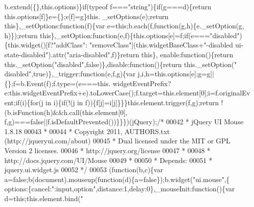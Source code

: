 \begin{DoxyCode}
      b.extend(\{\},this.options)\}\textcolor{keywordflow}{if}(typeof f===\textcolor{stringliteral}{"string"})\{\textcolor{keywordflow}{if}(g===d)\{\textcolor{keywordflow}{return} this.options[f]\}e=\{\};e[f]=g\}this.
      \_setOptions(e);\textcolor{keywordflow}{return} \textcolor{keyword}{this}\},\_setOptions:\textcolor{keyword}{function}(f)\{var e=\textcolor{keyword}{this};b.each(f,\textcolor{keyword}{function}(g,h)\{e.\_setOption(g,
      h)\});\textcolor{keywordflow}{return} \textcolor{keyword}{this}\},\_setOption:\textcolor{keyword}{function}(e,f)\{this.options[e]=f;\textcolor{keywordflow}{if}(e===\textcolor{stringliteral}{"disabled"})\{this.widget()[f?\textcolor{stringliteral}{"addClass"}:\textcolor{stringliteral}{
      "removeClass"}](this.widgetBaseClass+\textcolor{stringliteral}{"-disabled ui-state-disabled"}).attr(\textcolor{stringliteral}{"aria-disabled"},f)\}\textcolor{keywordflow}{return} \textcolor{keyword}{this}\},
      enable:\textcolor{keyword}{function}()\{\textcolor{keywordflow}{return} this.\_setOption(\textcolor{stringliteral}{"disabled"},\textcolor{keyword}{false})\},disable:\textcolor{keyword}{function}()\{\textcolor{keywordflow}{return} this.\_setOption(\textcolor{stringliteral}{"
      disabled"},\textcolor{keyword}{true})\},\_trigger:\textcolor{keyword}{function}(e,f,g)\{var j,i,h=this.options[e];g=g||\{\};f=b.Event(f);f.type=(e===this.
      widgetEventPrefix?e:this.widgetEventPrefix+e).toLowerCase();f.target=this.element[0];i=f.originalEvent;\textcolor{keywordflow}{if}(i)\{\textcolor{keywordflow}{for}(j
       in i)\{\textcolor{keywordflow}{if}(!(j in f))\{f[j]=i[j]\}\}\}this.element.trigger(f,g);\textcolor{keywordflow}{return} !(b.isFunction(h)&&h.call(this.element[0],
      f,g)===\textcolor{keyword}{false}||f.isDefaultPrevented())\}\}\})(jQuery);\textcolor{comment}{/*}
00042 \textcolor{comment}{ * jQuery UI Mouse 1.8.18}
00043 \textcolor{comment}{ *}
00044 \textcolor{comment}{ * Copyright 2011, AUTHORS.txt (http://jqueryui.com/about)}
00045 \textcolor{comment}{ * Dual licensed under the MIT or GPL Version 2 licenses.}
00046 \textcolor{comment}{ * http://jquery.org/license}
00047 \textcolor{comment}{ *}
00048 \textcolor{comment}{ * http://docs.jquery.com/UI/Mouse}
00049 \textcolor{comment}{ *}
00050 \textcolor{comment}{ * Depends:}
00051 \textcolor{comment}{ *  jquery.ui.widget.js}
00052 \textcolor{comment}{ */}
00053 (\textcolor{keyword}{function}(b,c)\{var a=\textcolor{keyword}{false};b(document).mouseup(\textcolor{keyword}{function}(d)\{a=\textcolor{keyword}{false}\});b.widget(\textcolor{stringliteral}{"ui.mouse"},\{
      options:\{cancel:\textcolor{stringliteral}{":input,option"},distance:1,delay:0\},\_mouseInit:\textcolor{keyword}{function}()\{var d=\textcolor{keyword}{this};this.element.bind(\textcolor{stringliteral}{"
}
\end{DoxyCode}
